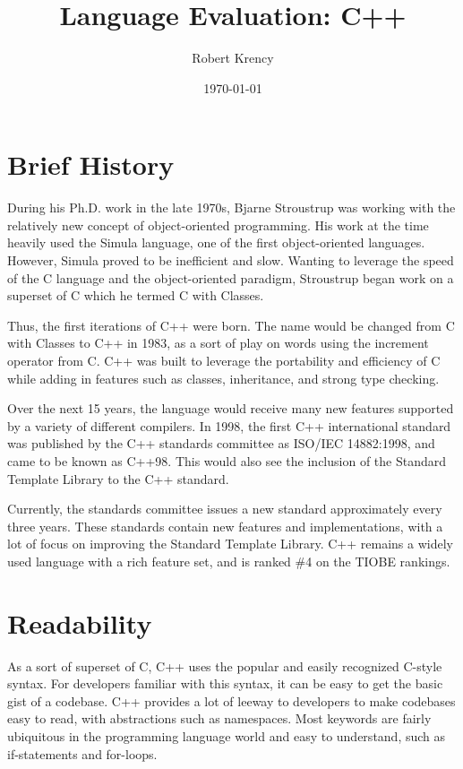 \documentclass[12pt]{article}
\title{Language Evaluation: C++}
\author{Robert Krency}
\date{\today}
\begin{document}
\maketitle
\pagebreak

\section{Brief History}

During his Ph.D. work in the late 1970s, Bjarne Stroustrup was working with the relatively new concept of object-oriented programming.
His work at the time heavily used the Simula language, one of the first object-oriented languages.
However, Simula proved to be inefficient and slow.
Wanting to leverage the speed of the C language and the object-oriented paradigm, Stroustrup began work on a superset of C which he termed C with Classes.

Thus, the first iterations of C++ were born.
The name would be changed from C with Classes to C++ in 1983, as a sort of play on words using the increment operator from C.
C++ was built to leverage the portability and efficiency of C while adding in features such as classes, inheritance, and strong type checking.

Over the next 15 years, the language would receive many new features supported by a variety of different compilers.
In 1998, the first C++ international standard was published by the C++ standards committee as ISO/IEC 14882:1998, and came to be known as C++98.
This would also see the inclusion of the Standard Template Library to the C++ standard.

Currently, the standards committee issues a new standard approximately every three years.
These standards contain new features and implementations, with a lot of focus on improving the Standard Template Library.
C++ remains a widely used language with a rich feature set, and is ranked \#4 on the TIOBE rankings.



\section{Readability}

As a sort of superset of C, C++ uses the popular and easily recognized C-style syntax.
For developers familiar with this syntax, it can be easy to get the basic gist of a codebase.
C++ provides a lot of leeway to developers to make codebases easy to read, with abstractions such as namespaces.
Most keywords are fairly ubiquitous in the programming language world and easy to understand, such as if-statements and for-loops.
\end{document}
